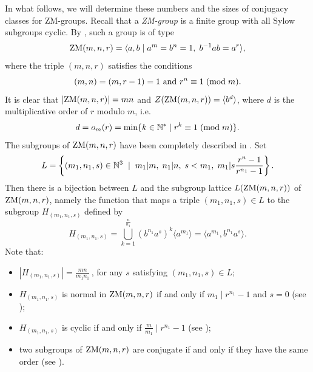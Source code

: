 \documentclass[12pt]{article}
\newcommand{\0}{{\leqno}}
\begin{document}
In what follows, we will determine these numbers and the sizes of conjugacy classes for ZM-groups. Recall that a \textit{ZM-group} is a finite group with all Sylow subgroups cyclic. By \cite{5}, such a group is of type
\begin{equation}
{\rm ZM}(m,n,r)=\langle a, b \mid a^m = b^n = 1,
\hspace{1mm}b^{-1} a b = a^r\rangle, \nonumber
\end{equation}
where the triple $(m,n,r)$ satisfies the conditions
\begin{equation}
(m,n)=(m,r-1)=1 \mbox{ and } r^n
\equiv 1 \hspace{1mm}({\rm mod}\hspace{1mm}m). \nonumber
\end{equation}\newpage \noindent It is clear that $|{\rm ZM}(m,n,r)|=mn$ and $Z({\rm ZM}(m,n,r))=\langle b^d\rangle$, where $d$ is the multiplicative order of
$r$ modulo $m$, i.e.
\begin{equation}
d=o_m(r)={\rm min}\{k\in\mathbb{N}^* \mid r^k\equiv 1 \hspace{1mm}({\rm mod} \hspace{1mm}m)\}.\nonumber
\end{equation}The subgroups of ${\rm ZM}(m,n,r)$ have been completely described
in \cite{2}. Set
\begin{equation}
L=\left\{(m_1,n_1,s)\in\mathbb{N}^3 \hspace{1mm}\mid\hspace{1mm}
m_1|m,\hspace{1mm} n_1|n,\hspace{1mm} s<m_1,\hspace{1mm}
m_1|s\frac{r^n-1}{r^{n_1}-1}\right\}.\nonumber
\end{equation}Then there is a bijection between $L$ and the subgroup lattice
$L({\rm ZM}(m,n,r))$ of ${\rm ZM}(m,n,r)$, namely the function
that maps a triple $(m_1,n_1,s)\in L$ to the subgroup $H_{(m_1,n_1,s)}$ defined by
\begin{equation}
H_{(m_1,n_1,s)}=\bigcup_{k=1}^{\frac{n}{n_1}}(b^{n_1}a^s)^k\langle a^{m_1}\rangle=\langle a^{m_1},b^{n_1}a^s\rangle.\nonumber
\end{equation}Note that:
\begin{itemize}
\item[-] $|H_{(m_1,n_1,s)}|=\frac{mn}{m_1n_1}$\,, for any $s$ satisfying $(m_1,n_1,s)\in L$;
\item[-] $H_{(m_1,n_1,s)}$ is normal in ${\rm ZM}(m,n,r)$ if and only if $m_1\mid r^{n_1}-1$ and $s=0$ (see \cite{10});
\item[-] $H_{(m_1,n_1,s)}$ is cyclic if and only if $\frac{m}{m_1}\mid r^{n_1}-1$ (see \cite{11});
\item[-] two subgroups of ${\rm ZM}(m,n,r)$ are conjugate if and only if they have the same order (see \cite{1}).
\end{itemize}
\end{document}
